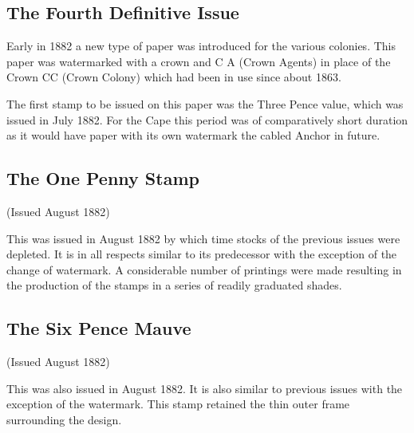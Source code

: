\subsection{The Fourth Definitive Issue
} 




Early in 1882 a new type of paper was introduced for the various colonies. This paper was watermarked with a crown and C A (Crown Agents) in place of the Crown CC (Crown Colony) which had been in use since about 1863.

The first stamp to be issued on this paper was the Three Pence value, which was issued in July 1882. For the Cape this period was of comparatively short duration as it would have paper with its own watermark the cabled Anchor in future.

 


 
\subsection{The One Penny Stamp}

(Issued August 1882)

This was issued in August 1882 by which time stocks of the previous issues were depleted. It is in all respects similar to its predecessor with the exception of the change of watermark. A considerable number of printings were made resulting in the production of the stamps in a series of readily graduated shades.

 


 
\subsection{The Six Pence Mauve}

(Issued August 1882)

This was also issued in August 1882. It is also similar to previous issues with the exception of the watermark. This stamp retained the thin outer frame surrounding the design.

 

 

 

 


